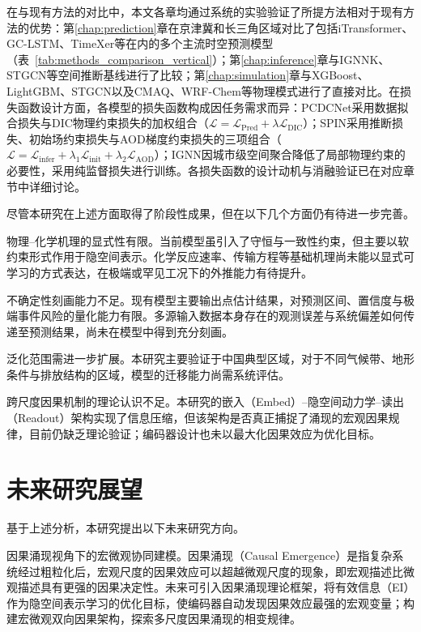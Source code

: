 在与现有方法的对比中，本文各章均通过系统的实验验证了所提方法相对于现有方法的优势：第\ref{chap:prediction}章在京津冀和长三角区域对比了包括iTransformer、GC-LSTM、TimeXer等在内的多个主流时空预测模型（表~\ref{tab:methods_comparison_vertical}）；第\ref{chap:inference}章与IGNNK、STGCN等空间推断基线进行了比较；第\ref{chap:simulation}章与XGBoost、LightGBM、STGCN以及CMAQ、WRF-Chem等物理模式进行了直接对比。在损失函数设计方面，各模型的损失函数构成因任务需求而异：PCDCNet采用数据拟合损失与DIC物理约束损失的加权组合（$\mathcal{L} = \mathcal{L}_{\mathrm{Pred}} + \lambda \mathcal{L}_{\mathrm{DIC}}$）；SPIN采用推断损失、初始场约束损失与AOD梯度约束损失的三项组合（$\mathcal{L} = \mathcal{L}_{\mathrm{infer}} + \lambda_1 \mathcal{L}_{\mathrm{init}} + \lambda_2 \mathcal{L}_{\mathrm{AOD}}$）；IGNN因城市级空间聚合降低了局部物理约束的必要性，采用纯监督损失进行训练。各损失函数的设计动机与消融验证已在对应章节中详细讨论。

尽管本研究在上述方面取得了阶段性成果，但在以下几个方面仍有待进一步完善。

物理--化学机理的显式性有限。当前模型虽引入了守恒与一致性约束，但主要以软约束形式作用于隐空间表示。化学反应速率、传输方程等基础机理尚未能以显式可学习的方式表达，在极端或罕见工况下的外推能力有待提升。

不确定性刻画能力不足。现有模型主要输出点估计结果，对预测区间、置信度与极端事件风险的量化能力有限。多源输入数据本身存在的观测误差与系统偏差如何传递至预测结果，尚未在模型中得到充分刻画。

泛化范围需进一步扩展。本研究主要验证于中国典型区域，对于不同气候带、地形条件与排放结构的区域，模型的迁移能力尚需系统评估。

跨尺度因果机制的理论认识不足。本研究的嵌入（Embed）--隐空间动力学--读出（Readout）架构实现了信息压缩，但该架构是否真正捕捉了涌现的宏观因果规律，目前仍缺乏理论验证；编码器设计也未以最大化因果效应为优化目标。


\section{未来研究展望}
\label{sec:outlook}

基于上述分析，本研究提出以下未来研究方向。

因果涌现视角下的宏微观协同建模。因果涌现（Causal Emergence）是指复杂系统经过粗粒化后，宏观尺度的因果效应可以超越微观尺度的现象，即宏观描述比微观描述具有更强的因果决定性\citep{hoel2013quantifying}。未来可引入因果涌现理论框架\citep{hoel2013quantifying,zhang2023neural}，将有效信息（EI）作为隐空间表示学习的优化目标，使编码器自动发现因果效应最强的宏观变量；构建宏微观双向因果架构，探索多尺度因果涌现的相变规律。

